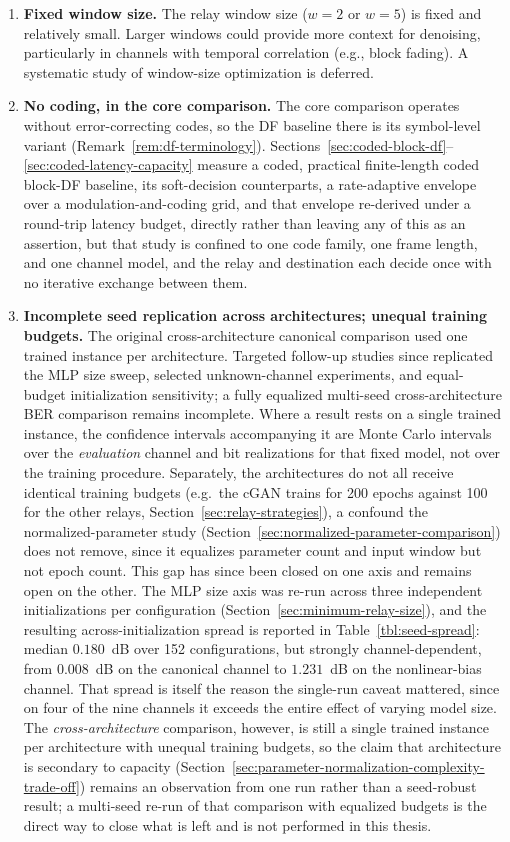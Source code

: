 \begin{enumerate}
\item
  \textbf{Fixed window size.} The relay window size (\(w = 2\) or \(w = 5\)) is fixed and relatively small. Larger windows could provide more context for denoising, particularly in channels with temporal correlation (e.g., block fading). A systematic study of window-size optimization is deferred.
\item
  \textbf{No coding, in the core comparison.} The core comparison operates without error-correcting codes, so the DF baseline there is its symbol-level variant (Remark~\ref{rem:df-terminology}). Sections~\ref{sec:coded-block-df}--\ref{sec:coded-latency-capacity} measure a coded, practical finite-length coded block-DF baseline, its soft-decision counterparts, a rate-adaptive envelope over a modulation-and-coding grid, and that envelope re-derived under a round-trip latency budget, directly rather than leaving any of this as an assertion, but that study is confined to one code family, one frame length, and one channel model, and the relay and destination each decide once with no iterative exchange between them.
\item
  \textbf{Incomplete seed replication across architectures; unequal training budgets.} The original cross-architecture canonical comparison used one trained instance per architecture. Targeted follow-up studies since replicated the MLP size sweep, selected unknown-channel experiments, and equal-budget initialization sensitivity; a fully equalized multi-seed cross-architecture BER comparison remains incomplete. Where a result rests on a single trained instance, the confidence intervals accompanying it are Monte Carlo intervals over the \emph{evaluation} channel and bit realizations for that fixed model, not over the training procedure. Separately, the architectures do not all receive identical training budgets (e.g.\ the cGAN trains for 200 epochs against 100 for the other relays, Section~\ref{sec:relay-strategies}), a confound the normalized-parameter study (Section~\ref{sec:normalized-parameter-comparison}) does not remove, since it equalizes parameter count and input window but not epoch count. This gap has since been closed on one axis and remains open on the other. The MLP size axis was re-run across three independent initializations per configuration (Section~\ref{sec:minimum-relay-size}), and the resulting across-initialization spread is reported in Table~\ref{tbl:seed-spread}: median $0.180$~dB over 152 configurations, but strongly channel-dependent, from $0.008$~dB on the canonical channel to $1.231$~dB on the nonlinear-bias channel. That spread is itself the reason the single-run caveat mattered, since on four of the nine channels it exceeds the entire effect of varying model size. The \emph{cross-architecture} comparison, however, is still a single trained instance per architecture with unequal training budgets, so the claim that architecture is secondary to capacity (Section~\ref{sec:parameter-normalization-complexity-trade-off}) remains an observation from one run rather than a seed-robust result; a multi-seed re-run of that comparison with equalized budgets is the direct way to close what is left and is not performed in this thesis.
\end{enumerate}

